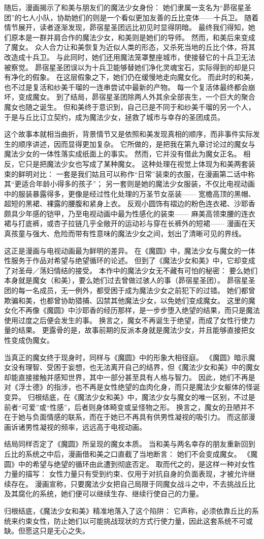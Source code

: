 随后，漫画揭示了和美与朋友们的魔法少女身份：
她们隶属一支名为“昴宿星圣团”的七人小队，协助她们的则是一个看似更加友善的丘比变体——十兵卫。
随着情节展开，读者逐渐发现，昴宿星圣团远比初见时显得阴暗。
最终我们得知，她们原本是一群并肩合作的魔法少女，和美则是她们的导师。
然而，和美后来变成了魔女。
众人合力让和美恢复为近似人类的形态，又杀死当地的丘比个体，将其改造成十兵卫。
与此同时，她们还用魔法笼罩整座城市，使接替它的十兵卫无法被察觉。
昴宿星圣团误以为十兵卫能够替她们净化灵魂宝石，实际得到的却是只有净化的假象。
在这层假象之下，她们仍在缓慢地走向魔女化。
而此时的和美，也不过是复活和纱美千瑠的一连串尝试中最新的产物。
每一个复活体最终都会崩坏，变成魔女。
到了结局，昴宿星圣团除两人外其余全部丧生，一个巨大的聚合魔女也随之诞生。
但和美终于意识到，自己已是不同于和纱美千瑠的另一个人，于是与丘比订立契约，成为魔法少女，拯救了城市与幸存的圣团成员。

这个故事本就相当曲折，背景情节又是依照和美发现真相的顺序，而非事件实际发生的顺序讲述，因而显得更加复杂。
它所做的，是把我在第九章讨论过的魔女与魔法少女的一体性落实成纸面上的事实。
然而，它并没有借此为魔女正名。
相反，它只是把魔法少女也写成了某种魔女。
这种处理在视觉上体现为和美两套装束的鲜明对比：
一套是我们姑且可以称作“日常”装束的衣服，在漫画第二话中称其“更适合年龄小得多的孩子”；
另一套则是她的魔法少女服装，不仅比电视动画中的服装暴露得多，更像是经过性化处理的万圣节女巫装——
宽檐高顶的黑帽、超短的黑裙、裸露的腰腹和紧身上衣。
反观小圆饰有褶边的粉色连衣裙、沙耶香颇具少年感的铠甲，乃至电视动画中最为性感化的装束——
麻美高领束腰的连衣裙与打底裤，或杏子拉链几乎全敞开的运动衫与穿在长裤外的短裙——
漫画在天真孩童与强大、危险而带有性意味的魔法少女之间，划出了清晰可见的界线。

这正是漫画与电视动画最为鲜明的差异。
在《魔圆》中，魔法少女与魔女的一体性服务于作品对希望与绝望循环的论述。
但到了《魔法少女和美》中，它却变成了对圣母／荡妇情结的接受。
本作中的魔法少女无不藏有可怕的秘密：
要么她们本身就是魔女（和美），要么她们过去曾做过骇人的事（昴宿星圣团）。
昴宿星圣团的每一名成员，无一例外，都受困于成为魔法少女之前犯下的过错。
她们都曾欺骗和美，也都曾协助猎捕、囚禁其他魔法少女，以免她们变成魔女。
这里的魔女化不再像《魔圆》中沙耶香的经历那样，是一步步堕入绝望的结果，而只是魔法使用过度之后便会发生的事。
换言之，魔女不再诞生于绝望，而成了女性行使力量的结果。
更露骨的是，故事前期的反派本身就是魔法少女，并且能够直接把女性变成伪魔女。

当真正的魔女终于现身时，同样与《魔圆》中的形象大相径庭。
《魔圆》暗示魔女没有理智、受困于妄想，也无法离开自己的结界，但《魔法少女和美》中的魔女却能直接接触并感知世界，其中一部分甚至具有人格与智力。
因此，她们不再是对《浮士德》的指涉，也不再是女性绝望的血肉化身，而只是魔法少女躯体的怪诞变异。
归根结底，在《魔法少女和美》中，魔法少女与魔女的唯一区别，不过是前者“可爱”或“性感”，后者则身体畸变或呈怪物之形。
换言之，魔女的丑陋并不在于她与负面情感的联系，而在于她已不再具有供男性凝视的吸引力。
而这部漫画诉诸男性凝视的频率，远远高于电视动画。

结局同样否定了《魔圆》所呈现的魔女本质。
当和美与两名幸存的朋友重新回到丘比的系统之中后，漫画借和美之口直截了当地断言：
她们不会变成魔女。
《魔圆》中的希望与绝望的循环由此遭到彻底否定。
取而代之的，是这样一种对女性力量的描写：
女性力量只有受到约束、仅用于对抗自身的负面表现，才被允许继续存在。
漫画宣称，只要魔法少女把自己局限于同魔女战斗之中，不去挑战丘比及其腐化的系统，她们便可以继续生存、继续行使自己的力量。

归根结底，《魔法少女和美》精准地落入了这个陷阱：
它声称，必须依靠丘比的系统来约束女性，防止她们以可能挑战现状的方式行使力量，因此这套系统不可或缺。但愿这只是无心之失。
